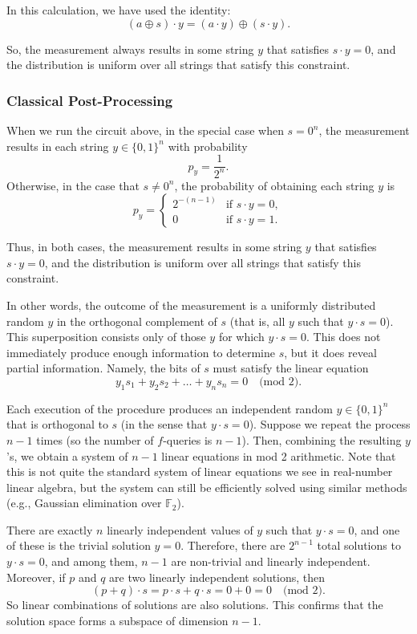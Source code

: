In this calculation, we have used the identity:
\[
(a \oplus s) \cdot y = (a \cdot y) \oplus (s \cdot y).
\]

So, the measurement always results in some string $y$ that satisfies $s \cdot y = 0$, and the distribution is uniform over all strings that satisfy this constraint.

\subsubsection{Classical Post-Processing}
When we run the circuit above, in the special case when $s = 0^n$, the measurement results in each string $y \in \{0,1\}^n$ with probability
\[
p_y = \frac{1}{2^n}.
\]
Otherwise, in the case that $s \neq 0^n$, the probability of obtaining each string $y$ is
\[
p_y = 
\begin{cases} 
    2^{-(n-1)} & \text{if } s \cdot y = 0, \\ 
    0 & \text{if } s \cdot y = 1. 
\end{cases}
\]

Thus, in both cases, the measurement results in some string $y$ that satisfies $s \cdot y = 0$, and the distribution is uniform over all strings that satisfy this constraint.

In other words, the outcome of the measurement is a uniformly distributed random $y$ in the orthogonal complement of $s$ (that is, all $y$ such that $y \cdot s = 0$). This superposition consists only of those $y$ for which $y \cdot s = 0$. This does not immediately produce enough information to determine $s$, but it does reveal partial information. Namely, the bits of $s$ must satisfy the linear equation
\[
y_1 s_1 + y_2 s_2 + \ldots + y_n s_n = 0 \quad \text{(mod 2)}.
\]

Each execution of the procedure produces an independent random $y \in \{0,1\}^n$ that is orthogonal to $s$ (in the sense that $y \cdot s = 0$). Suppose we repeat the process $n-1$ times (so the number of $f$-queries is $n-1$). Then, combining the resulting $y$'s, we obtain a system of $n-1$ linear equations in mod 2 arithmetic. Note that this is not quite the standard system of linear equations we see in real-number linear algebra, but the system can still be efficiently solved using similar methods (e.g., Gaussian elimination over $\mathbb{F}_2$).

There are exactly $n$ linearly independent values of $y$ such that $y \cdot s = 0$, and one of these is the trivial solution $y = 0$. Therefore, there are $2^{n-1}$ total solutions to $y \cdot s = 0$, and among them, $n-1$ are non-trivial and linearly independent. Moreover, if $p$ and $q$ are two linearly independent solutions, then
\[
(p + q) \cdot s = p \cdot s + q \cdot s = 0 + 0 = 0 \quad \text{(mod 2)}.
\]
So linear combinations of solutions are also solutions. This confirms that the solution space forms a subspace of dimension $n-1$.

